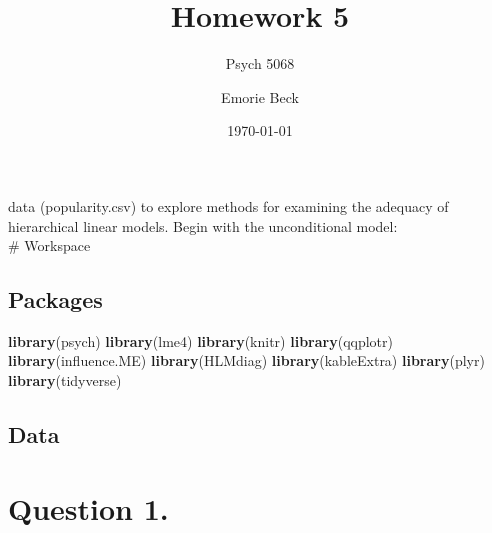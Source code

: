 \documentclass[]{article}
\title{Homework 5}
\subtitle{Psych 5068}
\author{Emorie Beck}
\date{\today}
\newenvironment{Shaded}{\begin{snugshade}}{\end{snugshade}}
\newcommand{\KeywordTok}[1]{\textcolor[rgb]{0.13,0.29,0.53}{\textbf{#1}}}
\newcommand{\DataTypeTok}[1]{\textcolor[rgb]{0.13,0.29,0.53}{#1}}
\newcommand{\DecValTok}[1]{\textcolor[rgb]{0.00,0.00,0.81}{#1}}
\newcommand{\StringTok}[1]{\textcolor[rgb]{0.31,0.60,0.02}{#1}}
\newcommand{\OperatorTok}[1]{\textcolor[rgb]{0.81,0.36,0.00}{\textbf{#1}}}
\newcommand{\NormalTok}[1]{#1}
\begin{document}
\maketitle

{
\setcounter{tocdepth}{2}
\tableofcontents
}
data (popularity.csv) to explore methods for examining the adequacy of
hierarchical linear models. Begin with the unconditional model:\\
\# Workspace

\subsection{Packages}\label{packages}

\begin{Shaded}
\begin{Highlighting}[]
\KeywordTok{library}\NormalTok{(psych)}
\KeywordTok{library}\NormalTok{(lme4)}
\KeywordTok{library}\NormalTok{(knitr)}
\KeywordTok{library}\NormalTok{(qqplotr)}
\KeywordTok{library}\NormalTok{(influence.ME)}
\KeywordTok{library}\NormalTok{(HLMdiag)}
\KeywordTok{library}\NormalTok{(kableExtra)}
\KeywordTok{library}\NormalTok{(plyr)}
\KeywordTok{library}\NormalTok{(tidyverse)}
\end{Highlighting}
\end{Shaded}

\subsection{Data}\label{data}

\begin{Shaded}
\end{Shaded}

\section{Question 1.}\label{question-1.}
\end{document}
